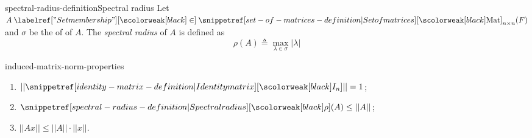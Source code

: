 \documentclass[preview]{standalone}
\begin{document}
\begin{snippetdefinition}{spectral-radius-definition}{Spectral radius}
    Let \(A \in \matrices_{n\times n}(F)\) and \(\sigma\) be the \set of \eigenvalue[eigenvalues] of \(A\).
    The \emph{spectral radius} of \(A\) is defined as
    \[
        \rho(A) \triangleq \max_{\lambda\in\sigma} |\lambda|
    \]
\end{snippetdefinition}

\begin{snippetproposition}{induced-matrix-norm-properties}{}
    \begin{enumerate}
        \item \(||\identmatrix{n}|| = 1\);
        \item \(\spectralradius(A) \leq ||A||\);
        \item \(||Ax|| \leq ||A|| \cdot ||x||\).
    \end{enumerate}
\end{snippetproposition}
\end{document}
